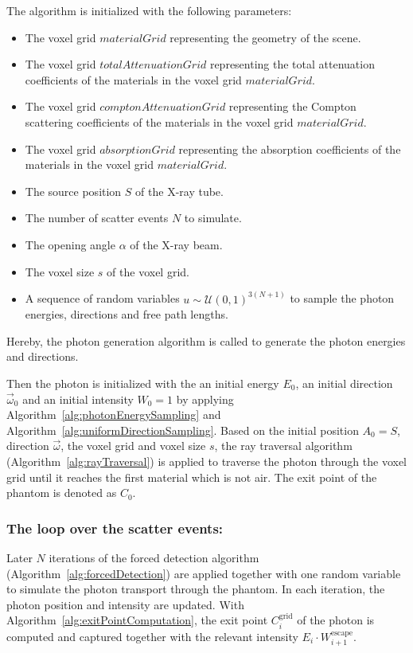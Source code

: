 The algorithm is initialized with the following parameters:
\begin{itemize}
    \item The voxel grid $materialGrid$ representing the geometry of the scene.
    \item The voxel grid $totalAttenuationGrid$ representing the total
    attenuation coefficients of the materials in the voxel grid $materialGrid$.
    \item The voxel grid $comptonAttenuationGrid$ representing the Compton
    scattering coefficients of the materials in the voxel grid $materialGrid$.
    \item The voxel grid $absorptionGrid$ representing the absorption
    coefficients of the materials in the voxel grid $materialGrid$.
    \item The source position $S$ of the X-ray tube.
    \item The number of scatter events $N$ to simulate.
    \item The opening angle $\alpha$ of the X-ray beam.
    \item The voxel size $s$ of the voxel grid.
    \item A sequence of random variables $u \sim \mathcal{U}(0, 1)^{3(N+1)}$ to
    sample the photon energies, directions and free path lengths.
\end{itemize}

Hereby, the photon generation algorithm is called to generate the photon energies and directions.

Then the photon is initialized with the an initial energy $E_0$, an initial
direction $\vec{\omega}_0$ and an initial intensity $W_0=1$ by applying
Algorithm~\ref{alg:photonEnergySampling} and
Algorithm~\ref{alg:uniformDirectionSampling}. Based on the initial position $A_0
= S$, direction $\vec{\omega}$, the voxel grid and voxel size $s$, the ray
traversal algorithm (Algorithm~\ref{alg:rayTraversal}) is applied to traverse
the photon through the voxel grid until it reaches the first material which is
not air. The exit point of the phantom is denoted as $C_0$.

\subsubsection*{The loop over the scatter events:}

Later $N$ iterations of the forced detection algorithm
(Algorithm~\ref{alg:forcedDetection}) are applied together with one random
variable to simulate the photon transport through the phantom. In each
iteration, the photon position and intensity are updated. With
Algorithm~\ref{alg:exitPointComputation}, the exit point $C_i^\text{grid}$ of
the photon is computed and captured together with the relevant intensity $E_i
\cdot W^{\text{escape}}_{i+1}$.

